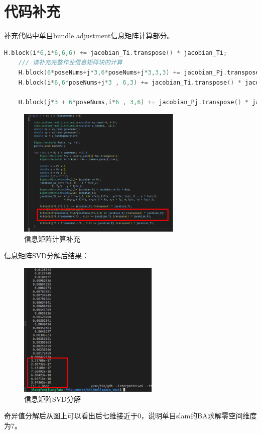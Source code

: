 \documentclass[UTF8]{ctexart}
\begin{document}
\newpage
\section{代码补充}
\indent 补充代码中单目bundle adjustment信息矩阵计算部分。\\
\begin{lstlisting}[language={c++}]
    H.block(i*6,i*6,6,6) += jacobian_Ti.transpose() * jacobian_Ti;
    /// 请补充完整作业信息矩阵块的计算
    H.block(6*poseNums+j*3,6*poseNums+j*3,3,3) += jacobian_Pj.transpose() * jacobian_Pj;
    H.block(i*6,6*poseNums+j*3 , 6,3) += jacobian_Ti.transpose() * jacobian_Pj;
    
    H.block(j*3 + 6*poseNums,i*6 , 3,6) += jacobian_Pj.transpose() * jacobian_Ti;
\end{lstlisting}

\begin{figure}[H]
\centering
\includegraphics[width=0.7\textwidth]{2.1.1.png}    
\caption{信息矩阵计算补充}
\label{img1}
\end{figure}
\indent 信息矩阵SVD分解后结果：\\
\begin{figure}[H]
\centering
\includegraphics[width=0.6\textwidth]{2.1.2.png}    
\caption{信息矩阵SVD分解}
\label{img1}
\end{figure}
\indent 奇异值分解后从图上可以看出后七维接近于0，说明单目slam的BA求解零空间维度为7。
\end{document}
